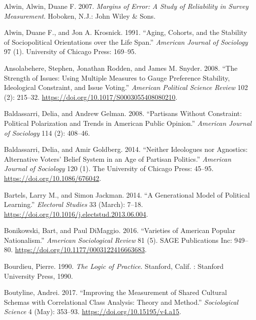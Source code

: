 \documentclass[12pt,]{article}
\begin{document}
\singlespace
\setlength{\parindent}{-0.2in}
\setlength{\leftskip}{0.2in}
\setlength{\parskip}{0pt}

\noindent

\hypertarget{refs}{}
\leavevmode\hypertarget{ref-alwin2007}{}%
Alwin, Alwin, Duane F. 2007. \emph{Margins of Error: A Study of Reliability in Survey Measurement}. Hoboken, N.J.: John Wiley \& Sons.

\leavevmode\hypertarget{ref-alwin1991}{}%
Alwin, Duane F., and Jon A. Krosnick. 1991. ``Aging, Cohorts, and the Stability of Sociopolitical Orientations over the Life Span.'' \emph{American Journal of Sociology} 97 (1). University of Chicago Press: 169--95.

\leavevmode\hypertarget{ref-ansolabehere2008}{}%
Ansolabehere, Stephen, Jonathan Rodden, and James M. Snyder. 2008. ``The Strength of Issues: Using Multiple Measures to Gauge Preference Stability, Ideological Constraint, and Issue Voting.'' \emph{American Political Science Review} 102 (2): 215--32. \url{https://doi.org/10.1017/S0003055408080210}.

\leavevmode\hypertarget{ref-baldassarri2008}{}%
Baldassarri, Delia, and Andrew Gelman. 2008. ``Partisans Without Constraint: Political Polarization and Trends in American Public Opinion.'' \emph{American Journal of Sociology} 114 (2): 408--46.

\leavevmode\hypertarget{ref-baldassarri2014}{}%
Baldassarri, Delia, and Amir Goldberg. 2014. ``Neither Ideologues nor Agnostics: Alternative Voters' Belief System in an Age of Partisan Politics.'' \emph{American Journal of Sociology} 120 (1). The University of Chicago Press: 45--95. \url{https://doi.org/10.1086/676042}.

\leavevmode\hypertarget{ref-bartels2014}{}%
Bartels, Larry M., and Simon Jackman. 2014. ``A Generational Model of Political Learning.'' \emph{Electoral Studies} 33 (March): 7--18. \url{https://doi.org/10.1016/j.electstud.2013.06.004}.

\leavevmode\hypertarget{ref-bonikowski2016}{}%
Bonikowski, Bart, and Paul DiMaggio. 2016. ``Varieties of American Popular Nationalism.'' \emph{American Sociological Review} 81 (5). SAGE Publications Inc: 949--80. \url{https://doi.org/10.1177/0003122416663683}.

\leavevmode\hypertarget{ref-bourdieu1990}{}%
Bourdieu, Pierre. 1990. \emph{The Logic of Practice}. Stanford, Calif. : Stanford University Press, 1990.

\leavevmode\hypertarget{ref-boutyline2017}{}%
Boutyline, Andrei. 2017. ``Improving the Measurement of Shared Cultural Schemas with Correlational Class Analysis: Theory and Method.'' \emph{Sociological Science} 4 (May): 353--93. \url{https://doi.org/10.15195/v4.a15}.
\end{document}
